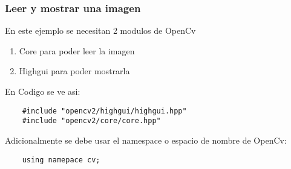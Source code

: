 \begin{frame}[fragile]
   \frametitle{Leer y mostrar una imagen}

        En este ejemplo se necesitan 2 modulos de OpenCv

        \begin{enumerate}
            \item Core para poder leer la imagen
            \item Highgui para poder mostrarla
        \end{enumerate}

        \vspace{1cm}

        En Codigo se ve asi:

        \begin{lstlisting}
    #include "opencv2/highgui/highgui.hpp"
    #include "opencv2/core/core.hpp"
        \end{lstlisting}

        Adicionalmente se debe usar el namespace o espacio de nombre de OpenCv:

        \begin{lstlisting}
    using namepace cv;
        \end{lstlisting}
\end{frame}
